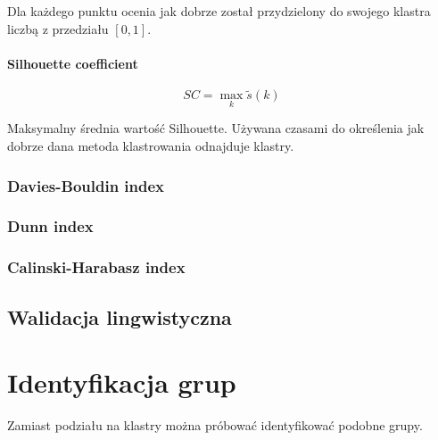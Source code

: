 \documentclass{article}
\begin{document}
Dla każdego punktu ocenia jak dobrze został przydzielony do swojego klastra
liczbą z przedziału $[0,1]$.

\paragraph{Silhouette coefficient}

\[ SC = \max_k \tilde{s}(k) \]

Maksymalny średnia wartość Silhouette. Używana czasami do określenia jak
dobrze dana metoda klastrowania odnajduje klastry.

\subsubsection{Davies-Bouldin index}

\subsubsection{Dunn index}

\subsubsection{Calinski-Harabasz index}

\subsection{Walidacja lingwistyczna}

\section{Identyfikacja grup}

Zamiast podziału na klastry można próbować identyfikować podobne grupy.
\end{document}
